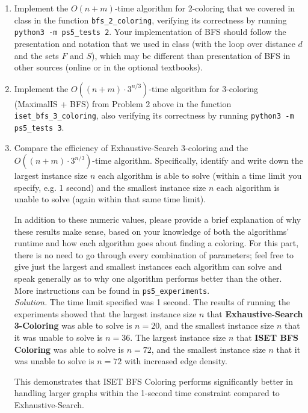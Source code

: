 \documentclass[11pt]{article}
\begin{document}
\begin{enumerate}
  \begin{enumerate}
      \item Implement the $O(n+m)$-time algorithm for 2-coloring that we covered in class in the function \texttt{bfs\_2\_coloring}, verifying its correctness by running \texttt{python3 -m ps5\_tests 2}.
        Your implementation of BFS should follow the presentation and notation that we used in class (with the loop over distance $d$ and the sets $F$ and $S$), which may be different than presentation of BFS in other sources (online or in the optional textbooks). 
        
      \item Implement the $O((n+m)\cdot 3^{n/3})$-time algorithm for 3-coloring (MaximalIS + BFS) from Problem 2 above in the function \texttt{iset\_bfs\_3\_coloring}, also verifying its correctness by running \texttt{python3 -m ps5\_tests 3}. \label{part:TbT}
    
    \item Compare the efficiency of Exhaustive-Search 3-coloring and the $O((n+m)\cdot 3^{n/3})$-time algorithm. Specifically, identify and write down the largest instance size $n$ each algorithm is able to solve (within a time limit you specify, e.g. 1 second) and the smallest instance size $n$ each algorithm is unable to solve (again within that same time limit). 
    
    In addition to these numeric values, please provide a brief explanation of why these results make sense, based on your knowledge of both the algorithms' runtime and how each algorithm goes about finding a coloring. For this part, there is no need to go through every combination of parameters; feel free to give just the largest and smallest instances each algorithm can solve and speak generally as to why one algorithm performs better than the other. More instructions can be found in \texttt{ps5\_experiments}. \\

    \textit{Solution. }
    The time limit specified was 1 second. The results of running the experiments showed that the largest instance size \( n \) that \textbf{Exhaustive-Search 3-Coloring} was able to solve is \( n = 20 \), and the smallest instance size \( n \) that it was unable to solve is \( n = 36 \). The largest instance size \( n \) that \textbf{ISET BFS Coloring} was able to solve is \( n = 72 \), and the smallest instance size \( n \) that it was unable to solve is \( n = 72 \) with increased edge density.

    This demonstrates that ISET BFS Coloring performs significantly better in handling larger graphs within the 1-second time constraint compared to Exhaustive-Search.


\end{enumerate}
\end{enumerate}
\end{document}
